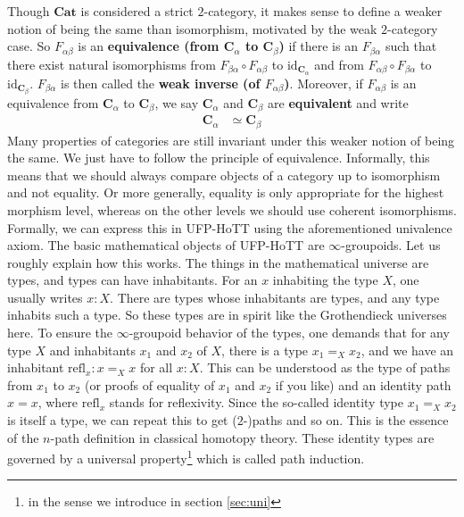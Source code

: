 Though $\mathbf{Cat}$ is considered a strict $2$-category, it makes sense to define a weaker notion of being the same than isomorphism, motivated by the weak $2$-category case.
So $F_{\alpha\beta}$ is an \textbf{equivalence (from $\mathbf{C}_{\alpha}$ to $\mathbf{C}_{\beta}$)} if there is an $F_{\beta\alpha}$ such that there exist natural isomorphisms from $F_{\beta\alpha} \circ F_{\alpha\beta}$ to $\mathrm{id}_{\mathbf{C}_{\alpha}}$ and from $F_{\alpha\beta} \circ F_{\beta\alpha}$ to $\mathrm{id}_{\mathbf{C}_{\beta}}$.
$F_{\beta\alpha}$ is then called the \textbf{weak inverse (of $F_{\alpha\beta}$)}.
Moreover, if $F_{\alpha\beta}$ is an equivalence from $\mathbf{C}_{\alpha}$ to $\mathbf{C}_{\beta}$, we say $\mathbf{C}_{\alpha}$ and $\mathbf{C}_{\beta}$ are \textbf{equivalent} and write
\begin{align*}
  \mathbf{C}_{\alpha}
  &\simeq
  \mathbf{C}_{\beta}
\end{align*}
Many properties of categories are still invariant under this weaker notion of being the same.
We just have to follow the {\glqq}principle of equivalence{\grqq}.
Informally, this means that we should always compare objects of a category up to isomorphism and not equality.
Or more generally, equality is only appropriate for the highest morphism level, whereas on the other levels we should use coherent isomorphisms.
Formally, we can express this in UFP-HoTT using the aforementioned univalence axiom.
The basic mathematical objects of UFP-HoTT are $\infty$-groupoids.
Let us roughly explain how this works.
The things in the mathematical universe are types, and types can have inhabitants.
For an $x$ inhabiting the type $X$, one usually writes $x \colon X$.
There are types whose inhabitants are types, and any type inhabits such a type.
So these types are in spirit like the Grothendieck universes here.
To ensure the $\infty$-groupoid behavior of the types, one demands that for any type $X$ and inhabitants $x_{1}$ and $x_{2}$ of $X$, there is a type $x_{1} =_{X} x_{2}$, and we have an inhabitant $\mathrm{refl}_{x} \colon x =_{X} x$ for all $x \colon X$.
This can be understood as the type of paths from $x_{1}$ to $x_{2}$ (or proofs of equality of $x_{1}$ and $x_{2}$ if you like) and an identity path $x = x$, where $\mathrm{refl}_{x}$ stands for reflexivity.
Since the so-called identity type $x_{1} =_{X} x_{2}$ is itself a type, we can repeat this to get ($2$-)paths and so on.
This is the essence of the $n$-path definition in classical homotopy theory.
These identity types are governed by a universal property\footnote{in the sense we introduce in section \ref{sec:uni}} which is called path induction.
